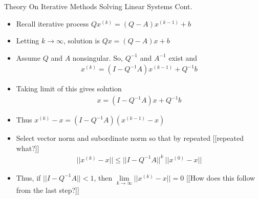 \documentclass[9pt, serif]{beamer}
\newlength{\wideitemsep}
\let\olditem\item
\renewcommand{\item}{\setlength{\itemsep}{\wideitemsep}\olditem}
\newcommand{\bi}{\begin{itemize}}
\newcommand{\ei}{\end{itemize}}
\begin{document}
\begin{frame}{Theory On Iterative Methods Solving Linear Systems Cont.}
    \bi
        \item Recall iterative process $Qx^{(k)} = (Q - A)x^{(k-1)} + b$ \pause
        \item Letting $k\rightarrow\infty$, solution is $Qx = (Q - A)x + b$ \pause
        \item Assume $Q$ and $A$ nonsingular. So, $Q^{-1}$ and $A^{-1}$ exist and
	    \begin{align*}
	        x^{(k)} = (I - Q^{-1}A)x^{(k-1)} + Q^{-1}b
	    \end{align*}
        \pause
        \item Taking limit of this gives solution
	    \begin{align*}
	        x = (I-Q^{-1}A)x+Q^{-1}b
	    \end{align*}
        \pause


        \item Thus $x^{(k)} - x = (I-Q^{-1}A)(x^{(k-1)}-x)$ \pause
        \item Select vector norm and subordinate norm so that by repeated [[repeated what?]]
	    \begin{align*}
	        ||x^{(k)} - x|| \leq || I -Q^{-1}A||^k~||x^{(0)}-x||
	    \end{align*}
        \pause
        \item Thus, if $|| I - Q^{-1}A|| < 1$, then $\lim\limits_{k\rightarrow\infty} ||x^{(k)} - x || = 0$ [[How does this follow from the last step?]]
    \ei
\end{frame}
\end{document}
